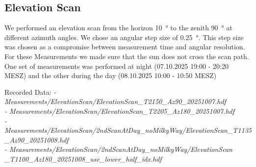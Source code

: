 \subsection{Elevation Scan}
We performed an elevation scan from the horizon \SI{10}{\degree} to the zenith \SI{90}{\degree} at different  azimuth angles.
We chose an angular step size of \SI{0.25}{\degree}. This step size was chosen as a compromise between measurement time and angular resolution.
For these Measurements we made sure that the sun does not cross the scan path.
One set of measurements was performed at night (07.10.2025 19:00 - 20:20 MESZ) and the other during the day (08.10.2025 10:00 - 10:50 MESZ)

Recorded Data:
\textit{
- Measurements/ElevationScan/ElevationScan\_T2150\_Az90\_20251007.hdf\\
- Measurements/ElevationScan/ElevationScan\_T2205\_Az180\_20251007.hdf\\
- Measurements/ElevationScan/2ndScanAtDay\_noMilkyWay/ElevationScan\_T1135\_Az90\_20251008.hdf\\
- Measurements/ElevationScan/2ndScanAtDay\_noMilkyWay/ElevationScan\\
    \_T1100\_Az180\_20251008\_use\_lower\_half\_idx.hdf\\
}
